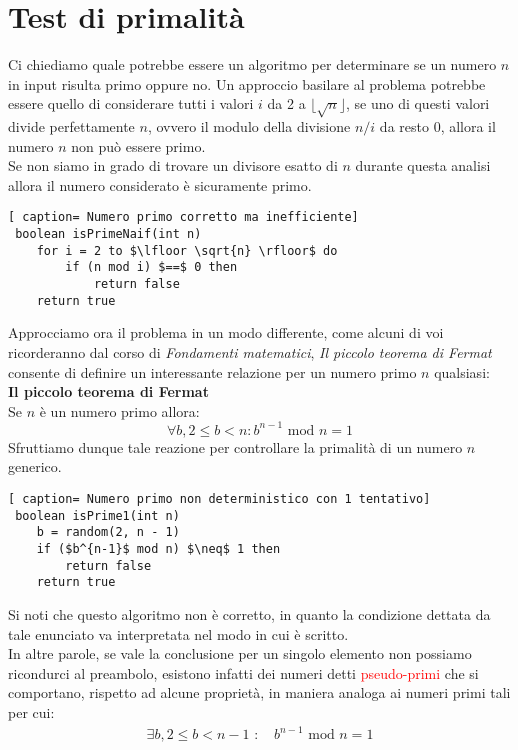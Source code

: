 \documentclass[../cheatSheetAlgoritmi.tex]{subfiles}
\begin{document}
\section{Test di primalità}
Ci chiediamo quale potrebbe essere un algoritmo per determinare se un numero $n$ in input risulta primo oppure no. 
Un approccio basilare al problema potrebbe essere quello di considerare tutti i valori $i$ da 2 a $\lfloor \sqrt{n} \rfloor$, se uno di questi valori divide perfettamente $n$, ovvero il modulo della divisione $n/i$ da resto $0$, allora il numero $n$ non può essere primo. \\
Se non siamo in grado di trovare un divisore esatto di $n$ durante questa analisi allora il numero considerato è sicuramente primo. 
 \begin{lstlisting}[ caption= Numero primo corretto ma inefficiente]
 boolean isPrimeNaif(int n)
 	for i = 2 to $\lfloor \sqrt{n} \rfloor$ do
 		if (n mod i) $==$ 0 then
 			return false
 	return true
\end{lstlisting}
Approcciamo ora il problema in un modo differente, come alcuni di voi ricorderanno dal corso di \emph{Fondamenti matematici}, \emph{Il piccolo teorema di Fermat} consente di definire un interessante relazione per un numero primo $n$ qualsiasi: \\
\textbf{Il piccolo teorema di Fermat} \\
Se $n$ è un numero primo allora:
\begin{equation*}
    \forall b, 2 \leq b < n : \text{$b^{n-1}$ mod $n = 1$}
\end{equation*}
Sfruttiamo dunque tale reazione per controllare la primalità di un numero $n$ generico.
 \begin{lstlisting}[ caption= Numero primo non deterministico con 1 tentativo]
 boolean isPrime1(int n)
 	b = random(2, n - 1)
 	if ($b^{n-1}$ mod n) $\neq$ 1 then
 		return false
 	return true
\end{lstlisting}
Si noti che questo algoritmo non è corretto, in quanto la condizione dettata da tale enunciato va interpretata nel modo in cui è scritto. \\
In altre parole, se vale la conclusione per un singolo elemento non possiamo ricondurci al preambolo, esistono infatti dei numeri detti \textcolor{red}{pseudo-primi} che si comportano, rispetto ad alcune proprietà, in maniera analoga ai numeri primi tali per cui: 
\begin{align*}
    \exists b, 2 \leq b < n - 1\text{ : } & \text{$b^{n-1}$ mod $n = 1$}
\end{align*}
\end{document}
